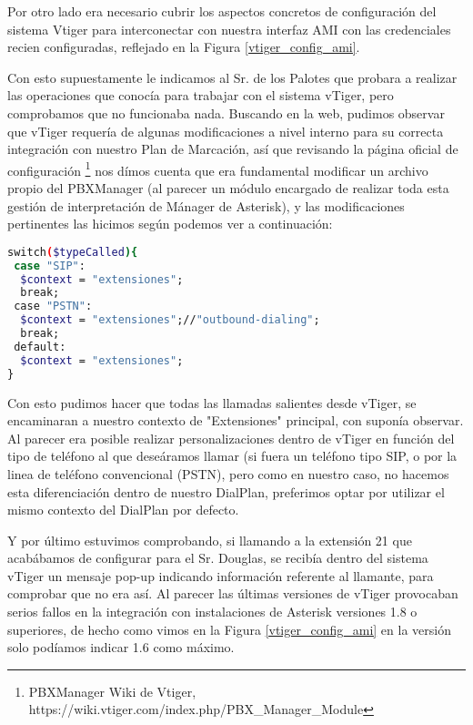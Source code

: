 {

Por otro lado era necesario cubrir los aspectos concretos de configuración del sistema Vtiger para interconectar con nuestra interfaz AMI con las credenciales recien configuradas, reflejado en la Figura \ref{vtiger_config_ami}.


Con esto supuestamente le indicamos al Sr. de los Palotes que probara a realizar las operaciones que conocía para trabajar con el sistema vTiger, pero comprobamos que no funcionaba nada. Buscando en la web, pudimos observar que vTiger requería de algunas modificaciones a nivel interno para su correcta integración con nuestro Plan de Marcación, así que revisando la página oficial de configuración \footnote{PBXManager Wiki de Vtiger, https://wiki.vtiger.com/index.php/PBX\_Manager\_Module} nos dímos cuenta que era fundamental modificar un archivo propio del PBXManager (al parecer un módulo encargado de realizar toda esta gestión de interpretación de Mánager de Asterisk), y las modificaciones pertinentes las hicimos según podemos ver a continuación:

\begin{lstlisting}[language=bash,title={./www/vtigercrm/modules/PBXManager/utils/AsteriskClass.php}]
switch($typeCalled){
 case "SIP":
  $context = "extensiones";
  break;
 case "PSTN":
  $context = "extensiones";//"outbound-dialing";
  break;
 default:
  $context = "extensiones";
}
\end{lstlisting}

Con esto pudimos hacer que todas las llamadas salientes desde vTiger, se encaminaran a nuestro contexto de "Extensiones" principal, con suponía observar. Al parecer era posible realizar personalizaciones dentro de vTiger en función del tipo de teléfono al que deseáramos llamar (si fuera un teléfono tipo SIP, o por la linea de teléfono convencional (PSTN), pero como en nuestro caso, no hacemos esta diferenciación dentro de nuestro DialPlan, preferimos optar por utilizar el mismo contexto del DialPlan por defecto.

Y por último estuvimos comprobando, si llamando a la extensión 21 que acabábamos de configurar para el Sr. Douglas, se recibía dentro del sistema vTiger un mensaje pop-up indicando información referente al llamante, para comprobar que no era así. Al parecer las últimas versiones de vTiger provocaban serios fallos en la integración con instalaciones de Asterisk versiones 1.8 o superiores, de hecho como vimos en la Figura \ref{vtiger_config_ami} en la versión solo podíamos indicar 1.6 como máximo. 

}
